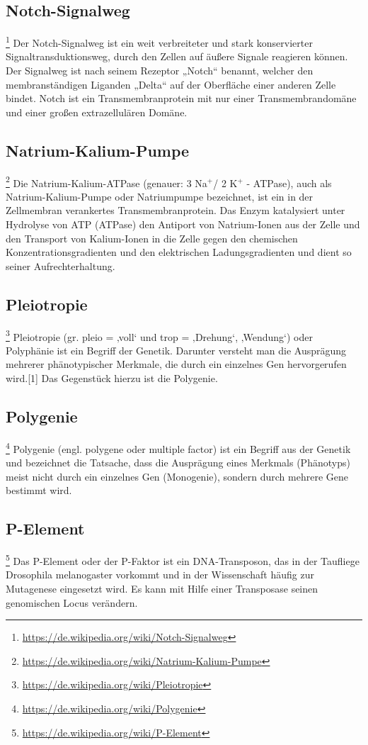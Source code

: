 \subsection{Notch-Signalweg}\footnote{\url{https://de.wikipedia.org/wiki/Notch-Signalweg}}
Der Notch-Signalweg ist ein weit verbreiteter und stark konservierter Signaltransduktionsweg, durch den Zellen auf äußere Signale reagieren können. Der Signalweg ist nach seinem Rezeptor „Notch“ benannt, welcher den membranständigen Liganden „Delta“ auf der Oberfläche einer anderen Zelle bindet. Notch ist ein Transmembranprotein mit nur einer Transmembrandomäne und einer großen extrazellulären Domäne.

\subsection{Natrium-Kalium-Pumpe}\footnote{\url{https://de.wikipedia.org/wiki/Natrium-Kalium-Pumpe}}
Die Natrium-Kalium-ATPase (genauer: 3 Na$^+$/ 2 K$^+$ - ATPase), auch als Natrium-Kalium-Pumpe oder Natriumpumpe bezeichnet, ist ein in der Zellmembran verankertes Transmembranprotein. Das Enzym katalysiert unter Hydrolyse von ATP (ATPase) den Antiport von Natrium-Ionen aus der Zelle und den Transport von Kalium-Ionen in die Zelle gegen den chemischen Konzentrationsgradienten und den elektrischen Ladungsgradienten und dient so seiner Aufrechterhaltung.

\subsection{Pleiotropie}\footnote{\url{https://de.wikipedia.org/wiki/Pleiotropie}}
Pleiotropie (gr. pleio = ‚voll‘ und trop = ‚Drehung‘, ‚Wendung‘) oder Polyphänie ist ein Begriff der Genetik. Darunter versteht man die Ausprägung mehrerer phänotypischer Merkmale, die durch ein einzelnes Gen hervorgerufen wird.[1] Das Gegenstück hierzu ist die Polygenie.

\subsection{Polygenie}\footnote{\url{https://de.wikipedia.org/wiki/Polygenie}}
Polygenie (engl. polygene oder multiple factor) ist ein Begriff aus der Genetik und bezeichnet die Tatsache, dass die Ausprägung eines Merkmals (Phänotyps) meist nicht durch ein einzelnes Gen (Monogenie), sondern durch mehrere Gene bestimmt wird.

\subsection{P-Element}\footnote{\url{https://de.wikipedia.org/wiki/P-Element}}
Das P-Element oder der P-Faktor ist ein DNA-Transposon, das in der Taufliege Drosophila melanogaster vorkommt und in der Wissenschaft häufig zur Mutagenese eingesetzt wird. Es kann mit Hilfe einer Transposase seinen genomischen Locus verändern.

